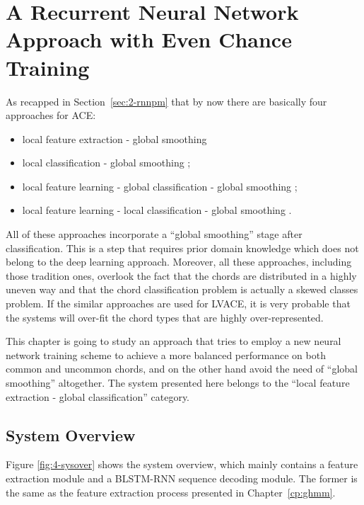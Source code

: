 
\chapter{A Recurrent Neural Network Approach with Even Chance Training}\label{cp:endtoend} %


As recapped in Section~\ref{sec:2-rnnpm} that by now there are basically four approaches for ACE:
\begin{itemize}
\item local feature extraction - global smoothing \cite{fujishima1999realtime,sheh2003chord}
\item local classification - global smoothing \cite{humphrey2012rethinking};
\item local feature learning - global classification - global smoothing \cite{boulanger2013audio,sigtia2015audio};
\item local feature learning - local classification - global smoothing \cite{zhou2015chord}.
\end{itemize}
All of these approaches incorporate a ``global smoothing'' stage after classification. This is a step that requires prior domain knowledge which does not belong to the deep learning approach. Moreover, all these approaches, including those tradition ones, overlook the fact that the chords are distributed in a highly uneven way and that the chord classification problem is actually a skewed classes problem. If the similar approaches are used for LVACE, it is very probable that the systems will over-fit the chord types that are highly over-represented.

This chapter is going to study an approach that tries to employ a new neural network training scheme to achieve a more balanced performance on both common and uncommon chords, and on the other hand avoid the need of ``global smoothing'' altogether. The system presented here belongs to the ``local feature extraction - global classification'' category.


\section{System Overview}\label{sec:4-sysover}
Figure \ref{fig:4-sysover} shows the system overview, which mainly contains a feature extraction module and a BLSTM-RNN sequence decoding module. The former is the same as the feature extraction process presented in Chapter~\ref{cp:ghmm}.


